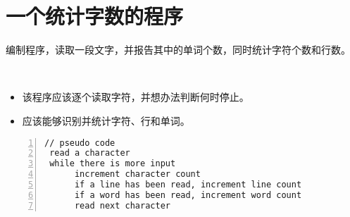 \section{一个统计字数的程序}

\begin{frame}[fragile]\ft{\secname}
  \begin{free}[例]{}
    编制程序，读取一段文字，并报告其中的单词个数，同时统计字符个数和行数。
  \end{free}　\pause 
  \begin{free}[要求]{}
  \begin{itemize}
  \item 该程序应该逐个读取字符，并想办法判断何时停止。\\[0.2in]
  \item 应该能够识别并统计字符、行和单词。
  \end{itemize}  
  \end{free}
\end{frame}

\begin{frame}[fragile]\ft{\secname}
\begin{lstlisting}[frame=single,numbers=left]
// pseudo code
 read a character
 while there is more input
      increment character count
      if a line has been read, increment line count
      if a word has been read, increment word count
      read next character
\end{lstlisting}
\end{frame}




